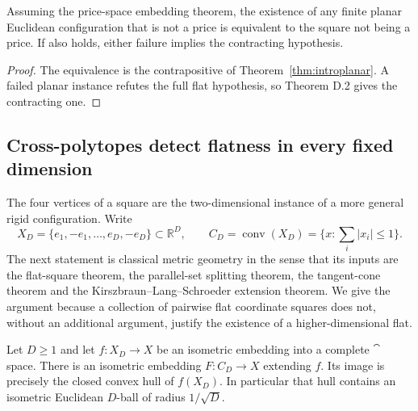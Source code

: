 \begin{corollary}\label{cor:planarobstruction}
Assuming the price-space embedding theorem, the existence of any
finite planar Euclidean configuration that is not a price is
equivalent to the square not being a price.
If \cite[Theorem D.2, pp.~30--31]{Anthropic2026} also holds,
either failure implies the contracting hypothesis.
\end{corollary}

\begin{proof}
The equivalence is the contrapositive of
Theorem~\ref{thm:introplanar}. A failed planar instance refutes
the full flat hypothesis, so Theorem D.2 gives the contracting one.
\end{proof}

\subsection{Cross-polytopes detect flatness in every fixed dimension}

The four vertices of a square are the two-dimensional instance of a
more general rigid configuration. Write
\[
 X_D=\{e_1,-e_1,\ldots,e_D,-e_D\}\subset\mathbb R^D,
 \qquad C_D=\operatorname{conv}(X_D)
           =\{x:\textstyle\sum_i|x_i|\le1\}.
\]
The next statement is classical metric geometry in the sense that its
inputs are the flat-square theorem, the parallel-set splitting theorem,
the tangent-cone theorem and the Kirszbraun--Lang--Schroeder extension
theorem. We give the argument because a collection of pairwise flat
coordinate squares does not, without an additional argument, justify
the existence of a higher-dimensional flat.

\begin{lemma}\label{lem:cross-polytope-flat}
Let $D\ge1$ and let $f:X_D\longrightarrow X$ be an isometric embedding
into a complete $\cat$ space. There is an isometric embedding
$F:C_D\longrightarrow X$ extending $f$. Its image is precisely the
closed convex hull of $f(X_D)$. In particular that hull contains an
isometric Euclidean $D$-ball of radius $1/\sqrt D$.
\end{lemma}


